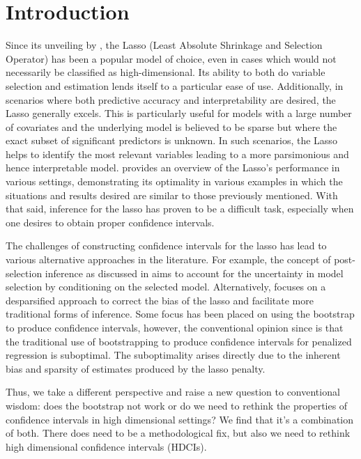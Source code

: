\section{Introduction}

Since its unveiling by \cite{Tibshirani1996}, the Lasso (Least Absolute Shrinkage and Selection Operator) has been a popular model of choice, even in cases which would not necessarily be classified as high-dimensional. Its ability to both do variable selection and estimation lends itself to a particular ease of use. Additionally, in scenarios where both predictive accuracy and interpretability are desired, the Lasso generally excels. This is particularly useful for models with a large number of covariates and the underlying model is believed to be sparse but where the exact subset of significant predictors is unknown. In such scenarios, the Lasso helps to identify the most relevant variables leading to a more parsimonious and hence interpretable model. \cite{HTF2009} provides an overview of the Lasso's performance in various settings, demonstrating its optimality in various examples in which the situations and results desired are similar to those previously mentioned. With that said, inference for the lasso has proven to be a difficult task, especially when one desires to obtain proper confidence intervals.

The challenges of constructing confidence intervals for the lasso has lead to various alternative approaches in the literature. For example, the concept of post-selection inference as discussed in \cite{LeeEtAl2016} aims to account for the uncertainty in model selection by conditioning on the selected model. Alternatively, \cite{ZhangZhang2014} focuses on a desparsified approach to correct the bias of the lasso and facilitate more traditional forms of inference. Some focus has been placed on using the bootstrap to produce confidence intervals, however, the conventional opinion since \cite{Chatterjee2010} is that the traditional use of bootstrapping to produce confidence intervals for penalized regression is suboptimal. The suboptimality arises directly due to the inherent bias and sparsity of estimates produced by the lasso penalty.

Thus, we take a different perspective and raise a new question to conventional wisdom: does the bootstrap not work or do we need to rethink the properties of confidence intervals in high dimensional settings? We find that it's a combination of both. There does need to be a methodological fix, but also we need to rethink high dimensional confidence intervals (HDCIs).

